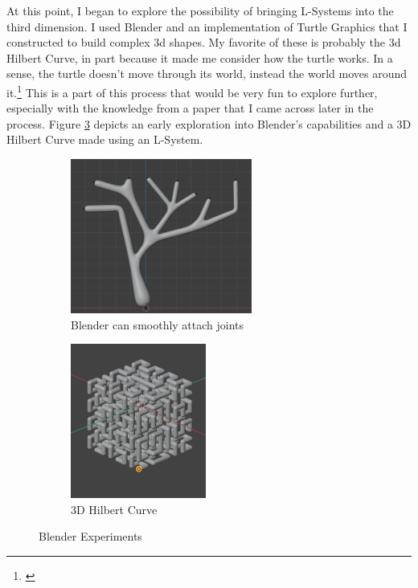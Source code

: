 \documentclass[12pt,twoside]{reedthesis}
\begin{document}
	At this point, I began to explore the possibility of bringing L-Systems into the third dimension. I used Blender and an implementation of Turtle Graphics that I constructed to build complex 3d shapes. My favorite of these is probably the 3d Hilbert Curve, in part because it made me consider how the turtle works. In a sense, the turtle doesn't move through its world, instead the world moves around it.\footnote{\cite{derose1989}} This is a part of this process that would be very fun to explore further, especially with the knowledge from a paper that I came across later in the process. Figure \ref{BlenderImages} depicts an early exploration into Blender's capabilities and a 3D Hilbert Curve made using an L-System.
	
	
	\begin{figure}[h]
	\centering
	\begin{subfigure}{0.55\linewidth}
		\centering
		\includegraphics[height=2in]{Images/Blender1}
		\caption{Blender can smoothly attach joints}
		\label{SmoothTree}
	\end{subfigure}%
	\hfill
	\begin{subfigure}{0.41\linewidth}
		\centering
		\includegraphics[height=2in]{Images/3DHilbert}
		\caption{3D Hilbert Curve}
		\label{3DHilbert}
	\end{subfigure}
	\caption{Blender Experiments}
	\label{BlenderImages}
	\end{figure}
	
\end{document}
